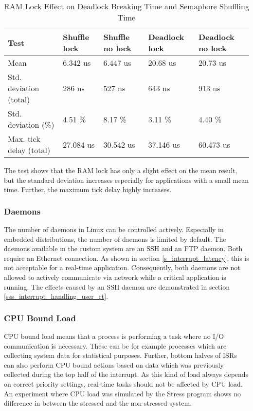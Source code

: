 \begin{table}[htbp]
	\centering
		\begin{tabular}{|l||l|l||l|l|}
			\hline
				Test 											& Shuffle lock & Shuffle no lock & Deadlock lock & Deadlock no lock \\
				\hline 
				Mean  										& 6.342 us		 & 6.447 us 			 & 20.68 us			 & 20.73 us					\\
			  \hline
			  Std. deviation (total)	  & 286 ns			 & 527 ns 				 & 643 ns				 & 913 ns						\\
			  \hline 
			  Std. deviation (\%)  			& 4.51 \%			 & 8.17 \% 				 & 3.11 \% 			 & 4.40 \%					\\ 
			  \hline
			  Max. tick delay	(total)		& 27.084 us	 	 & 30.542 us 			 & 37.146 us		 & 60.473 us				\\
			\hline
		\end{tabular}
	\caption{RAM Lock Effect on Deadlock Breaking Time and Semaphore Shuffling Time}
	\label{tab_results_ram_lock}
\end{table}

The test shows that the \ac{RAM} lock has only a slight effect on the mean result, but the standard deviation increases especially for applications with a small mean time. 
Further, the maximum tick delay highly increases.

\subsubsection{Daemons}
The number of daemons in Linux can be controlled actively.
Especially in embedded distributions, the number of daemons is limited by default.
The daemons available in the custom system are an \ac{SSH} and an \ac{FTP} daemon.
Both require an Ethernet connection.
As shown in section \ref{s_interrupt_latency}, this is not acceptable for a real-time application.
Consequently, both daemons are not allowed to actively communicate via network while a critical application is running.
The effects caused by an \ac{SSH} daemon are demonstrated in section \ref{sss_interrupt_handling_user_rt}.

\subsubsection{CPU Bound Load}
\ac{CPU} bound load means that a process is performing a task where no \ac{I/O} communication is necessary.
These can be for example processes which are collecting system data for statistical purposes. 
Further, bottom halves of \acp{ISR} can also perform \ac{CPU} bound actions based on data which was previously collected during the top half of the interrupt.
As this kind of load always depends on correct priority settings, real-time tasks should not be affected by \ac{CPU} load. 
An experiment where \ac{CPU} load was simulated by the Stress program shows no difference in between the stressed and the non-stressed system.

